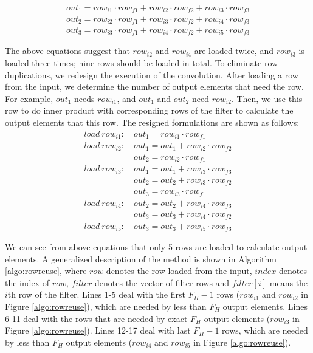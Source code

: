 \begin{gather*}
  out_1=row_{i1} \cdot row_{f1} + row_{i2} \cdot row_{f2} + row_{i3} \cdot row_{f3} \\
out_{2}=row_{i2} \cdot row_{f1} + row_{i3} \cdot row_{f2} + row_{i4} \cdot row_{f3} \\
	out_{3}=row_{i3} \cdot row_{f1} + row_{i4} \cdot row_{f2} + row_{i5} \cdot row_{f3}
\end{gather*}

The above equations suggest that $row_{i2}$ and $row_{i4}$ are loaded twice, and $row_{i3}$ is loaded three times; nine rows should be loaded in total. To eliminate row duplications, we redesign the execution of the convolution. After loading a row from the input, we determine the number of output elements that need the row. For example, $out_1$ needs $row_{i1}$, and $out_1$ and $out_2$ need $row_{i2}$. Then, we use
this row to do inner product with corresponding rows of the filter to calculate the output elements that this row. The resigned formulations are shown as follows:
\begin{equation}\nonumber
\begin{aligned}
load\ row_{i1}:
&\ out_1=row_{i1} \cdot row_{f1} \\
load\ row_{i2}:
&\ out_1 = out_1+row_{i2} \cdot row_{f2}\\
&\ out_2=row_{i2} \cdot row_{f1}\\
load\ row_{i3}:
&\ out_1 = out_1+row_{i3} \cdot row_{f3}\\
&\ out_2 = out_2+row_{i3} \cdot row_{f2}\\
&\ out_{3}=row_{i3} \cdot row_{f1}\\
load\ row_{i4}:
&\ out_2=out_2+row_{i4} \cdot row_{f3} \\
&\ out_3=out_3+row_{i4} \cdot row_{f2}\\
load\ row_{i5}:
&\ out_3=out_3+row_{i5} \cdot row_{f3}
\end{aligned}	
\end{equation}



We can see from above equations that only 5 rows are loaded to calculate output elements. A generalized description of the method is
shown in Algorithm \ref{algo:rowreuse}, where $row$ denotes the row loaded from the input, $index$ denotes the index of $row$, $filter$ denotes
the vector of filter rows and $filter[i]$ means the $i$th row of the filter. Lines 1-5 deal with the first $F_H-1$ rows ($row_{i1}$ and $row_{i2}$ in Figure \ref{algo:rowreuse}), which
are needed by less than $F_H$ output elements. Lines 6-11 deal with the rows that are needed by exact $F_H$ output elements ($row_{i3}$ in
Figure \ref{algo:rowreuse}). Lines 12-17 deal with last $F_H-1$ rows, which are needed by less than $F_H$ output elements ($row_{i4}$
and $row_{i5}$ in Figure \ref{algo:rowreuse}).

